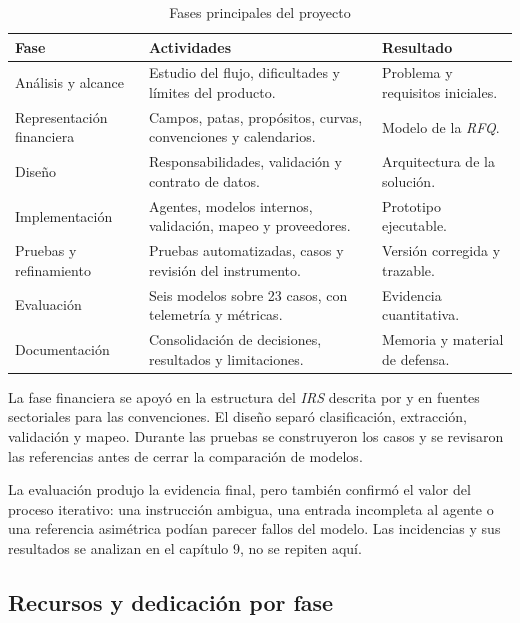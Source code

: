 \begin{table}[H]
\centering
\small
\caption{Fases principales del proyecto}
\label{tab:fases_proyecto}
\begin{tabular}{|P{3.0cm}|P{6.8cm}|P{3.8cm}|}
\hline
\textbf{Fase} & \textbf{Actividades} & \textbf{Resultado} \\
\hline
Análisis y alcance & Estudio del flujo, dificultades y límites del producto. & Problema y requisitos iniciales. \\
\hline
Representación financiera & Campos, patas, propósitos, curvas, convenciones y calendarios. & Modelo de la \textit{RFQ}. \\
\hline
Diseño & Responsabilidades, validación y contrato de datos. & Arquitectura de la solución. \\
\hline
Implementación & Agentes, modelos internos, validación, mapeo y proveedores. & Prototipo ejecutable. \\
\hline
Pruebas y refinamiento & Pruebas automatizadas, casos y revisión del instrumento. & Versión corregida y trazable. \\
\hline
Evaluación & Seis modelos sobre 23 casos, con telemetría y métricas. & Evidencia cuantitativa. \\
\hline
Documentación & Consolidación de decisiones, resultados y limitaciones. & Memoria y material de defensa. \\
\hline
\end{tabular}
\end{table}

La fase financiera se apoyó en la estructura del \textit{IRS} descrita por \textcite[Definición~2.19, p.~59]{ausin2025quantitative} y en fuentes sectoriales para las convenciones. El diseño separó clasificación, extracción, validación y mapeo. Durante las pruebas se construyeron los casos y se revisaron las referencias antes de cerrar la comparación de modelos.

La evaluación produjo la evidencia final, pero también confirmó el valor del proceso iterativo: una instrucción ambigua, una entrada incompleta al agente o una referencia asimétrica podían parecer fallos del modelo. Las incidencias y sus resultados se analizan en el capítulo 9, no se repiten aquí.

\subsection{Recursos y dedicación por fase}
\label{sec:recursos_dedicacion}

